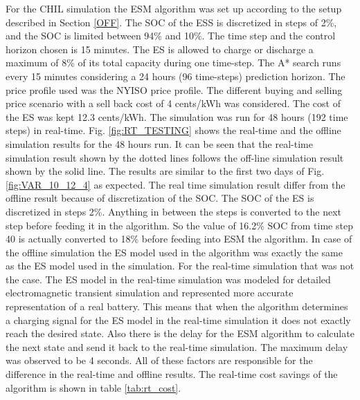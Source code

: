 For the CHIL simulation the ESM algorithm was set up according to the setup described in Section \ref{OFF}. The  SOC of the ESS is discretized in steps of 2\%, and the SOC is limited between  94\%  and  10\%. The time step and the control horizon chosen is 15 minutes. The ES is allowed to charge or discharge a maximum of 8\% of its total capacity during one time-step. The A* search runs every 15 minutes considering a 24 hours (96 time-steps) prediction horizon. The price profile used was the NYISO price profile. The different buying and selling price scenario with a sell back cost of 4 cents/kWh was considered. The cost of the ES was kept 12.3 cents/kWh. The simulation was run for 48 hours (192 time steps) in real-time. Fig. \ref{fig:RT_TESTING} shows the real-time and the offline simulation results for the 48 hours run. It can be seen that the real-time simulation result shown by the dotted lines follows the off-line simulation result shown by the solid line. The results are similar to the first two days of Fig. \ref{fig:VAR_10_12_4} as expected. The real time simulation result differ from the offline result because of discretization of the SOC. The SOC of the ES is discretized in steps 2\%. Anything in between the steps is converted to the next step before feeding it in the algorithm. So the value of 16.2\% SOC from time step 40 is actually converted to 18\% before feeding into ESM the algorithm. In case of the offline simulation the ES model used in the algorithm was exactly the same as the ES model used in the simulation. For the real-time simulation that was not the case. The ES model in the real-time simulation was modeled for detailed electromagnetic transient simulation and represented more accurate representation of a real battery. This means that when the algorithm determines a charging signal for the ES model in the real-time simulation it does not exactly reach the desired state. Also there is the delay for the ESM algorithm to calculate the next state and send it back to the real-time simulation. The maximum delay was observed to be 4 seconds. All of these factors are responsible for the difference in the real-time and offline results. The real-time cost savings of the algorithm is shown in table \ref{tab:rt_cost}. 



